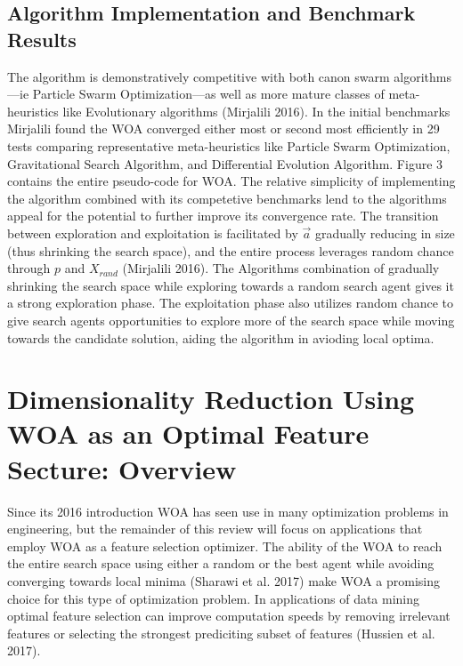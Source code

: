 \documentclass[11pt]{article}
\begin{document}
\subsection*{Algorithm Implementation and Benchmark Results} {
    The algorithm is demonstratively competitive with both canon swarm algorithms---ie Particle Swarm Optimization---as well as more mature classes of meta-heuristics like Evolutionary algorithms (Mirjalili 2016).
    In the initial benchmarks Mirjalili found the WOA converged either most or second most efficiently in 29 tests comparing representative meta-heuristics like Particle Swarm Optimization, Gravitational Search Algorithm, and Differential Evolution Algorithm.
    Figure 3 contains the entire pseudo-code for WOA.
    The relative simplicity of implementing the algorithm combined with its competetive benchmarks lend to the algorithms appeal for the potential to further improve its convergence rate.
    The transition between exploration and exploitation is facilitated by $\vec{a}$ gradually reducing in size (thus shrinking the search space), and the entire process leverages random chance through $p$ and $X_{rand}$ (Mirjalili 2016).
    The Algorithms combination of gradually shrinking the search space while exploring towards a random search agent gives it a strong exploration phase.
    The exploitation phase also utilizes random chance to give search agents opportunities to explore more of the search space while moving towards the candidate solution, aiding the algorithm in avioding local optima.
}

\section*{Dimensionality Reduction Using WOA as an Optimal Feature Secture: Overview} {
    Since its 2016 introduction WOA has seen use in many optimization problems in engineering, but the remainder of this review will focus on applications that employ WOA as a feature selection optimizer.
    The ability of the WOA to reach the entire search space using either a random or the best agent while avoiding converging towards local minima (Sharawi et al. 2017) make WOA a promising choice for this type of optimization problem.
    In applications of data mining optimal feature selection can improve computation speeds by removing irrelevant features or selecting the strongest prediciting subset of features (Hussien et al. 2017).
}
\end{document}
